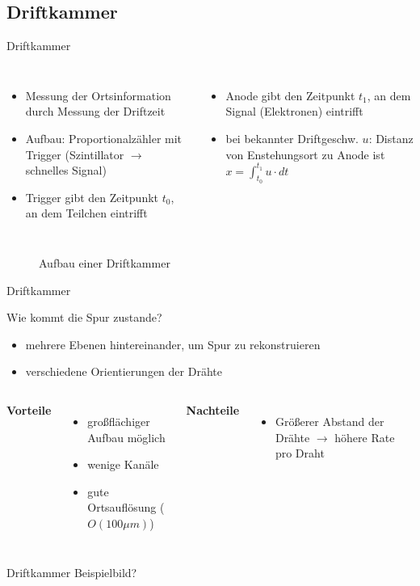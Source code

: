 \subsection[]{Driftkammer}

\begin{frame}{Driftkammer}
    \begin{columns}[T]
	    	\begin{itemize}
	    	  \item Messung der Ortsinformation durch Messung der Driftzeit
			  \item Aufbau: Proportionalzähler mit Trigger (Szintillator $\rightarrow$ schnelles Signal)
			  \item Trigger gibt den Zeitpunkt $t_0$, an dem Teilchen eintrifft
			\end{itemize}
			
	    	\begin{itemize}
			  \item Anode gibt den Zeitpunkt $t_1$, an dem Signal (Elektronen) eintrifft
			  \item bei bekannter Driftgeschw. $u$: Distanz von Enstehungsort zu Anode ist
			  $x=\int_{t_0}^{t_1}u\cdot dt$
			\end{itemize}
    \end{columns}

	\begin{figure}[htbp]
	  	\centering
		
	  	\caption{Aufbau einer Driftkammer}
	\end{figure}
\end{frame}

\begin{frame}{Driftkammer}

	\begin{block}{Wie kommt die Spur zustande?}
		\begin{itemize}
		  \item mehrere Ebenen hintereinander, um Spur zu rekonstruieren
		  \item verschiedene Orientierungen der Drähte
		\end{itemize}
	\end{block}
	\vspace{0.8cm}
    \begin{columns}[T]
			\textbf{Vorteile}		
			\begin{itemize}
			  \item großflächiger Aufbau möglich
			  \item wenige Kanäle
			  \item gute Ortsauflösung ($O(100\mu m)$)
			\end{itemize}	
	    	\textbf{Nachteile}
	    	\begin{itemize}
			  \item Größerer Abstand der Drähte $\rightarrow$ höhere Rate pro Draht 
			\end{itemize}
    \end{columns}
    \vspace{1cm}
\end{frame}

\begin{frame}{Driftkammer}
    Beispielbild?
\end{frame}